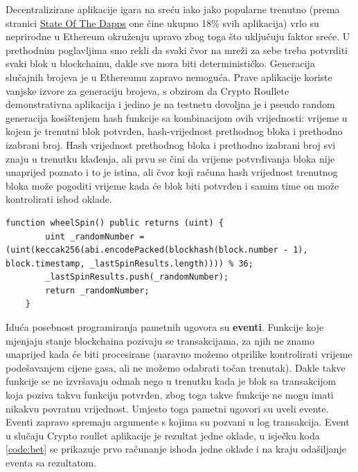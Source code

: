 \documentclass[a4paper,oneside,12pt]{memoir} %
\begin{document}
Decentralizirane aplikacije igara na sreću iako jako popularne trenutno (prema stranici \href{https://www.stateofthedapps.com/}{State Of The Dapps} one čine ukupno 18\% svih aplikacija) vrlo su neprirodne u Ethereum okruženju upravo zbog toga što uključuju faktor sreće. U prethodnim poglavljima smo rekli da svaki čvor na mreži za sebe treba potvrditi svaki blok u blockchainu, dakle sve mora biti determinističko. Generacija slučajnih brojeva je u Ethereumu zapravo nemoguća. Prave aplikacije koriste vanjske izvore za generaciju brojeva, s obzirom da Crypto Roullete demonstrativna aplikacija i jedino je na testnetu dovoljna je i pseudo random generacija kosištenjem hash funkcije sa kombinacijom ovih vrijednosti: vrijeme u kojem je trenutni blok potvrđen, hash-vrijednost prethodnog bloka i prethodno izabrani broj. Hash vrijednost prethodnog bloka i prethodno izabrani broj svi znaju u trenutku klađenja, ali prvu se čini da vrijeme potvrđivanja bloka nije unaprijed poznato i to je istina, ali čvor koji računa hash vrijednost trenutnog bloka može pogoditi vrijeme kada će blok biti potvrđen i samim time on može kontrolirati ishod oklade.

\begin{lstlisting}[caption=CryptoRoulette funkcija koja imitira generaciju brojeva pomoću hash funkcije keccak256 (SHA256) i nije sigurna za stvarnu upotrebu.]
function wheelSpin() public returns (uint) {
        uint _randomNumber = (uint(keccak256(abi.encodePacked(blockhash(block.number - 1), block.timestamp, _lastSpinResults.length)))) % 36;
        _lastSpinResults.push(_randomNumber);
        return _randomNumber;
    }
\end{lstlisting}

Iduća posebnost programiranja pametnih ugovora su \textbf{eventi}. Funkcije koje mjenjaju stanje blockchaina pozivaju se transakcijama, za njih ne znamo unaprijed kada će biti procesirane (naravno možemo otprilike kontrolirati vrijeme podešavanjem cijene gasa, ali ne možemo odabrati točan trenutak). Dakle takve funkcije se ne izvršavaju odmah nego u trenutku kada je blok sa transakcijom koja poziva takvu funkciju potvrđen, zbog toga takve funkcije ne mogu imati nikakvu povratnu vrijednost. Umjesto toga pametni ugovori su uveli evente. Eventi zapravo spremaju argumente s kojima su pozvani u log transakcija. Event u slučaju Crypto roullet aplikacije je rezultat jedne oklade, u isječku koda \ref{code:bet} se prikazuje prvo računanje ishoda jedne oklade i na kraju odašiljanje eventa sa rezultatom.
\end{document}
